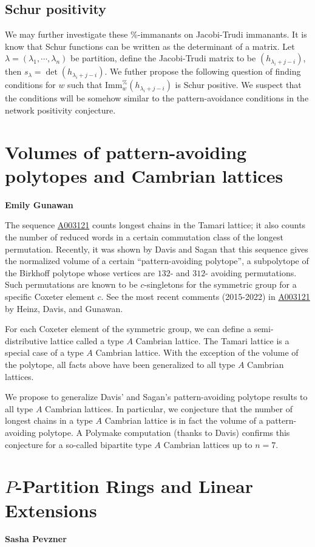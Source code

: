 \documentclass{paper}
\newcommand{\imm}[0]{\text{Imm}}
\begin{document}
\subsection{Schur positivity}
We may further investigate these \%-immanants on Jacobi-Trudi immanants. It is know that Schur functions can be written as the determinant of a matrix. Let $\lambda=(\lambda_1,\cdots,\lambda_n)$ be partition, define the Jacobi-Trudi matrix to be $ (h_{\lambda_{i}+j-i})$, then $s_\lambda=\det(h_{\lambda_{i}+j-i})$. We futher propose the following question of
finding conditions for $w$ such that $\imm_w^\%(h_{\lambda_{i}+j-i})$ is Schur positive.
We suspect that the conditions will be somehow similar to the pattern-avoidance conditions in the network positivity conjecture.

        
\section{Volumes of pattern-avoiding polytopes and Cambrian lattices}\hfill{\textbf{Emily Gunawan}}

The sequence \href{https://oeis.org/A003121}{A003121} counts longest chains in the Tamari lattice; it also counts the number of reduced words in a certain commutation class of the longest permutation. Recently, it was shown by Davis and Sagan that this sequence gives the normalized volume of a certain ``pattern-avoiding polytope'', a subpolytope of the Birkhoff polytope whose vertices are $132$- and $312$- avoiding permutations. Such permutations are known to be $c$-singletons for the symmetric group for a specific Coxeter element $c$. See the most recent comments (2015-2022) in \href{https://oeis.org/A003121}{A003121} by Heinz, Davis, and Gunawan.

For each Coxeter element of the symmetric group, we can define a semi-distributive lattice called a type $A$ Cambrian lattice. The Tamari lattice is a special case of a type $A$ Cambrian lattice. With the exception of the volume of the polytope, all facts above have been generalized to all type $A$ Cambrian lattices.

We propose to generalize Davis' and Sagan's pattern-avoiding polytope results to all type $A$ Cambrian lattices. In particular, we conjecture that the number of longest chains in a type $A$ Cambrian lattice is in fact the volume of a pattern-avoiding polytope. A Polymake computation (thanks to Davis) confirms this conjecture for a so-called bipartite type $A$ Cambrian lattices up to $n=7$.
\section{$P$-Partition Rings and Linear Extensions}
\hfill{\textbf{Sasha Pevzner}}
\end{document}
